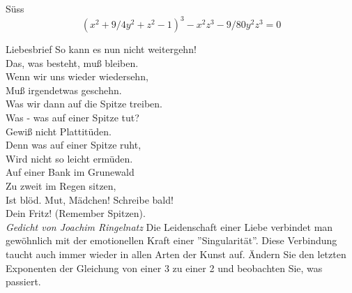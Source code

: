 \begin{surferPage}{Süss}
\[(x^2+ 9/4y^2	+ z^2- 1)^3- x^2z^3	- 9/80y^2z^3	= 0\]

\singlespacing
Liebesbrief
\singlespacing
So kann es nun nicht weitergehn! \\
Das, was besteht, muß bleiben. \\
Wenn wir uns wieder wiedersehn, \\
Muß irgendetwas geschehn. \\
Was wir dann auf die Spitze treiben.\\ 
Was - was auf einer Spitze tut? \\
Gewiß nicht Plattitüden. \\
Denn was auf einer Spitze ruht, \\
Wird nicht so leicht ermüden. \\
Auf einer Bank im Grunewald \\
Zu zweit im Regen sitzen, \\
Ist blöd. Mut, Mädchen! Schreibe bald! \\
Dein Fritz! (Remember Spitzen). \\
 {\it Gedicht von Joachim Ringelnatz}
\singlespacing 
Die Leidenschaft einer Liebe verbindet man gewöhnlich mit der emotionellen Kraft einer ''Singularität''. Diese Verbindung taucht auch immer wieder in allen Arten der Kunst auf.
\singlespacing 
Ändern Sie den letzten Exponenten der Gleichung von einer 3 zu einer 2 und beobachten Sie, was passiert.
\end{surferPage}
